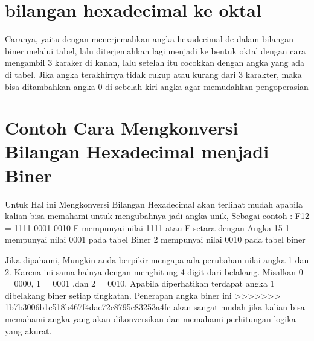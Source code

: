 \section{bilangan hexadecimal ke oktal}
Caranya, yaitu dengan menerjemahkan angka hexadecimal de dalam bilangan biner melalui tabel, lalu diterjemahkan lagi menjadi ke bentuk oktal dengan cara mengambil 3 karaker di kanan, lalu setelah itu cocokkan dengan angka yang ada di tabel. Jika angka terakhirnya tidak cukup atau kurang dari 3 karakter, maka bisa ditambahkan angka 0 di sebelah kiri angka agar memudahkan pengoperasian

\section{Contoh Cara Mengkonversi Bilangan Hexadecimal menjadi Biner}
 Untuk Hal ini Mengkonversi Bilangan Hexadecimal akan terlihat mudah apabila kalian bisa memahami untuk mengubahnya jadi angka unik, Sebagai contoh :
 F12 = 1111 0001 0010
 F mempunyai nilai 1111 atau F setara dengan Angka 15
 1 mempunyai nilai 0001 pada tabel Biner
 2 mempunyai nilai 0010 pada tabel biner
 
 Jika dipahami, Mungkin anda berpikir mengapa ada perubahan nilai angka 1 dan 2. Karena ini sama halnya dengan menghitung 4 digit dari belakang.
 Misalkan 0 = 0000, 1 = 0001 ,dan 2 = 0010. Apabila diperhatikan terdapat angka 1 dibelakang biner setiap tingkatan. Penerapan angka biner ini
>>>>>>> 1b7b3006b1c518b467f4dae72c8795e83253a4fc
 akan sangat mudah jika kalian bisa memahami angka yang akan dikonversikan dan memahami perhitungan logika yang akurat.